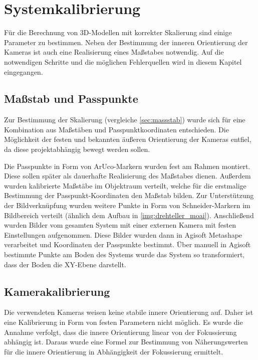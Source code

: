 \documentclass[./00PhotoBox.tex]{subfiles}
\begin{document}
\chapter{Systemkalibrierung}

Für die Berechnung von 3D-Modellen mit korrekter Skalierung sind einige Parameter zu bestimmen. Neben der Bestimmung der inneren Orientierung der Kameras ist auch eine Realisierung eines Maßstabes notwendig. Auf die notwendigen Schritte und die möglichen Fehlerquellen wird in diesem Kapitel eingegangen.

\section{Maßstab und Passpunkte}
\label{sec:passpunkt_bestimmung}
Zur Bestimmung der Skalierung (vergleiche \autoref{sec:massstab}) wurde sich für eine Kombination aus Maß\-stäben und Passpunktkoordinaten entschieden. Die Möglichkeit der festen und bekannten äußeren Orientierung der Kameras entfiel, da diese projektabhängig bewegt werden sollen.

Die Passpunkte in Form von ArUco-Markern wurden fest am Rahmen montiert. Diese sollen später als dauerhafte Realisierung des Maßstabes dienen. Außerdem wurden kalibrierte Maßstäbe im Objektraum verteilt, welche für die erstmalige Bestimmung der Passpunkt-Koordinaten den Maßstab bilden. Zur Unterstützung der Bildverknüpfung wurden weitere Punkte in Form von Schneider-Markern im Bildbereich verteilt (ähnlich dem Aufbau in \autoref{img:drehteller_moai}). Anschließend wurden Bilder vom gesamten System mit  einer externen Kamera mit festen Einstellungen aufgenommen. Diese Bilder wurden dann in Agisoft Metashape verarbeitet und Koordinaten der Passpunkte bestimmt. Über manuell in Agisoft bestimmte Punkte am Boden des Systems wurde das System so transformiert, dass der Boden die XY-Ebene darstellt.

\section{Kamerakalibrierung}
Die verwendeten Kameras weisen keine stabile innere Orientierung auf. Daher ist eine Kalibrierung in Form von festen Parametern nicht möglich. Es wurde die Annahme verfolgt, dass die innere Orientierung linear von der Fokussierung abhängig ist. Daraus wurde eine Formel zur Bestimmung von Näherungswerten für die innere Orientierung in Abhängigkeit der Fokussierung ermittelt.
\end{document}
